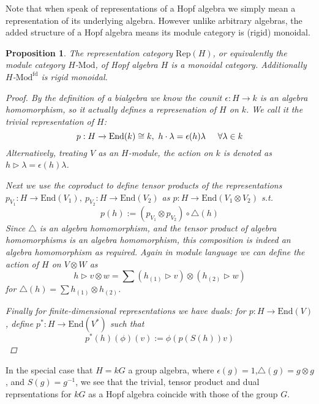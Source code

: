 \documentclass[11pt]{article}
\newcommand{\bb}{\medbreak}
\newcommand{\nt}{\noindent}
\newcommand{\rt}{\xrightarrow{}}
\newcommand{\End}{\text{End}}
\newcommand{\Rep}{\text{Rep}}
\newcommand{\Mod}{\text{Mod}}
\newtheorem{proposition}[lemma]{Proposition}
\theoremstyle{definition}
\begin{document}
\nt Note that when speak of representations of a Hopf algebra we simply mean a representation of its underlying algebra. However unlike arbitrary algebras, the added structure of a Hopf algebra means its module category is (rigid) monoidal.

\begin{proposition} The representation category $\Rep(H)$, or equivalently the module category $H$-$\Mod$, of Hopf algebra $H$ is a monoidal category. Additionally $H$-$\Mod^\text{fd}$ is rigid monoidal.
\begin{proof}
By the definition of a bialgebra we know the counit $\epsilon:H\rt k$ is an algebra homomorphism, so it actually defines a represenation of $H$ on $k$. We call it the trivial representation of $H$: 
$$p:H \rt \End(k)\cong k,\ h \cdot\lambda=\epsilon(h)\lambda\hspace{.5cm} \forall \lambda\in k$$
Alternatively, treating $V$ as an $H$-module, the action on $k$ is denoted as $h\rhd \lambda=\epsilon(h)\lambda$.\bb

\nt Next we use the coproduct to define tensor products of the representations $p_{V_1}:H\rt \text{End}(V_1),\ p_{V_2}:H\rt \text{End}(V_2)$ as $p:H\rt \text{End}(V_1\otimes V_2)$ s.t.
$$p(h):=(p_{V_1}\otimes p_{V_2})\circ \triangle(h)$$
Since $\triangle$ is an algebra homomorphism, and the tensor product of algebra homomorphisms is an algebra homomorphism, this composition is indeed an algebra homomorphism as required. Again in module language we can define the action of $H$ on $V\otimes W$ as 
$$h\rhd v\otimes w=\sum (h_{(1)}\rhd v)\otimes (h_{(2)}\rhd w)$$
for $\triangle(h)=\sum h_{(1)}\otimes h_{(2)}$.\bb

\nt Finally for finite-dimensional representations we have duals: for $p:H\rt \text{End}(V)$, define $p^*:H\rt \text{End}(V^*)$ such that 
$$p^*(h)(\phi)(v):=\phi(p(S(h))v)$$
\end{proof}
\end{proposition}

\nt In the special case that $H=kG$ a group algebra, where $\epsilon(g)=1$,$\triangle(g)=g\otimes g$, and $S(g)=g^{-1}$, we see that the trivial, tensor product and dual reprsentations for $kG$ as a Hopf algebra coincide with those of the group $G$.

\end{document}
